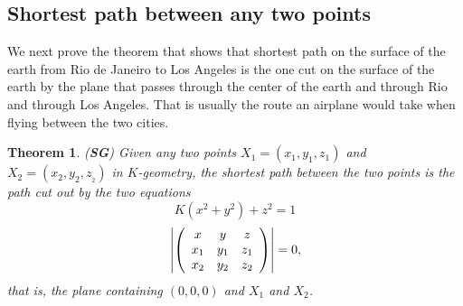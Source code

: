 \documentclass{article}%
\newtheorem{theorem}{Theorem}
\begin{document}
\pagebreak

\subsection{Shortest path between any two points}

We next prove the theorem that shows that shortest path on the surface of the
earth from Rio de Janeiro to Los Angeles is the one cut on the surface of the
earth by the plane that passes through the center of the earth and through Rio
and through Los Angeles. That is usually the route an airplane would take when
flying between the two cities.

\begin{theorem}
(\textbf{SG}) Given any two points $X_{1}=\left(  x_{1},y_{1},z_{1}\right)  $
and $X_{2}=\left(  x_{2},y_{2},z_{_{2}}\right)  $ in $K$-geometry, the
shortest path between the two points is the path cut out by the two equations%
\[
K\left(  x^{2}+y^{2}\right)  +z^{2}=1
\]%
\begin{equation}
\left\vert \left(
\begin{array}
[c]{ccc}%
x & y & z\\
x_{1} & y_{1} & z_{1}\\
x_{2} & y_{2} & z_{2}%
\end{array}
\right)  \right\vert =0, \label{63}%
\end{equation}
that is, the plane containing $\left(  0,0,0\right)  $ and $X_{1}$ and $X_{2}$.
\end{theorem}
\end{document}

